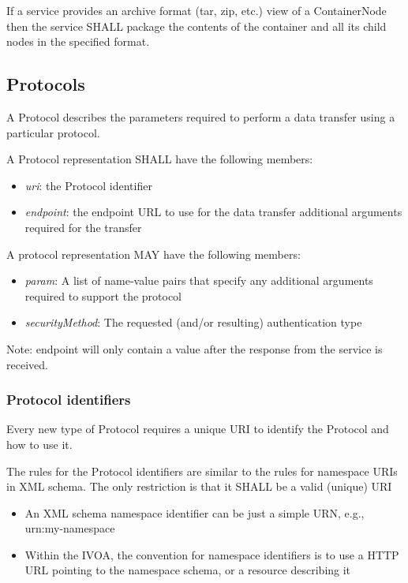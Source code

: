 \documentclass[11pt,a4paper]{ivoa}
\begin{document}
If a service provides an archive format (tar, zip, etc.) view of a ContainerNode then the service SHALL package the contents of the container and all its child nodes in the specified format.

\subsection{Protocols}
\label{subsec:protocols}
A Protocol describes the parameters required to perform a data transfer using a particular protocol.

A Protocol representation SHALL have the following members:

\begin{itemize}
    \item \emph{uri}: the Protocol identifier
    \item \emph{endpoint}: the endpoint URL to use for the data transfer additional arguments required for the transfer
\end{itemize}

A protocol representation MAY have the following members:

\begin{itemize}
    \item \emph{param}: A list of name-value pairs that specify any additional arguments required to support the protocol
    \item \emph{securityMethod}: The requested (and/or resulting) authentication type
\end{itemize}

Note: endpoint will only contain a value after the response from the service is received.

\subsubsection{Protocol identifiers}
\label{subsubsec:protocol identifiers}
Every new type of Protocol requires a unique URI to identify the Protocol and how to use it.

The rules for the Protocol identifiers are similar to the rules for namespace URIs in XML schema. The only restriction is that it SHALL be a valid (unique) URI

\begin{itemize}
    \item An XML schema namespace identifier can be just a simple URN, e.g., urn:my-namespace
    \item Within the IVOA, the convention for namespace identifiers is to use a HTTP URL pointing to the namespace schema, or a resource describing it
\end{itemize}
\end{document}
